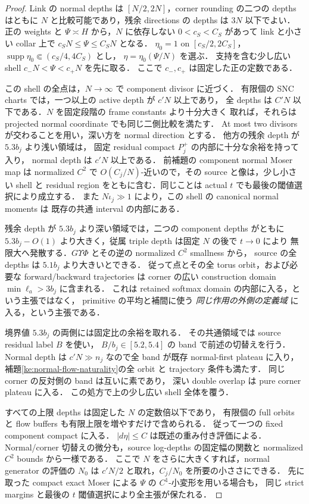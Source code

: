 \begin{proof}
Link の normal depths は $[N/2,2N]$，corner rounding の二つの depths はともに
$N$ と比較可能であり，残余 directions の depths は $3N$ 以下でよい．
正の weights と $\Psi\asymp H$ から，$N$ に依存しない $0<c_S<C_S$ があって
link と小さい collar 上で
$c_SN\le\Psi\le C_SN$ となる．
$\eta_0=1$ on $[c_S/2,2C_S]$，
$\operatorname{supp}\eta_0\Subset(c_S/4,4C_S)$ とし，
$\eta=\eta_0(\Psi/N)$ を選ぶ．
支持を含む少し広い shell $c_-N<\Psi<c_+N$ を先に取る．
ここで $c_-,c_+$ は固定した正の定数である．

この shell の全点は，$N\to\infty$ で component divisor に近づく．
有限個の SNC charts では，一つ以上の active depth が $c'N$ 以上であり，
全 depths は $C'N$ 以下である．$N$ を固定段階の frame constants より十分大きく
取れば，それらは projected normal coordinate でも同じ二側比較を満たす．
At most two divisors が交わることを用い，深い方を normal direction とする．
他方の残余 depth が $5.3b_j$ より浅い領域は，
固定 residual compact $P_j^+$ の内部に十分な余裕を持って入り，
normal depth は $c'N$ 以上である．
前補題の component normal Moser map は normalized $C^2$ で
$O(C_j/N)$-近いので，その source と像は，少し小さい shell と residual region
をともに含む．同じことは actual $t$ でも最後の閾値選択により成立する．
また $N\iota_j\gg1$ により，この shell の canonical normal moments は
既存の共通 interval の内部にある．

残余 depth が $5.3b_j$ より深い領域では，二つの component depths がともに
$5.3b_j-O(1)$ より大きく，従属 triple depth は固定 $N$ の後で $t\to0$ により
無限大へ発散する．$G\Upsilon\Phi$ とその逆の normalized $C^2$ smallness から，
source の全 depths は $5.1b_j$ より大きいとできる．
従って点とその全 torus orbit，および必要な forward/backward trajectories は
corner の広い construction domain $\min\ell_a>3b_j$ に含まれる．
これは retained softmax domain の内部に入る，という主張ではなく，
primitive の平均と補間に使う \emph{同じ作用の外側の定義域} に入る，という主張である．

境界値 $5.3b_j$ の両側には固定比の余裕を取れる．
その共通領域では source residual label $B$ を使い，
$B/b_j\in[5.2,5.4]$ の band で前述の切替えを行う．
Normal depth は $c'N\gg n_j$ なので全 band が既存 normal-first plateau に入り，
補題\ref{ke:normal-flow-naturality}の全 orbit と trajectory 条件も満たす．
同じ corner の反対側の band は互いに素であり，
深い double overlap は pure corner plateau に入る．
この処方で上の少し広い shell 全体を覆う．

すべての上限 depths は固定した $N$ の定数倍以下であり，
有限個の full orbits と flow buffers も有限上限を増やすだけで含められる．
従って一つの fixed component compact に入る．
$|d\eta|\le C$ は既述の重み付き評価による．
Normal/corner 切替えの微分も，source log-depths の固定幅の関数と
normalized $C^2$ bounds から一様である．
ここで $N$ をさらに大きくすれば，normal generator の評価の
$N_0$ は $c'N/2$ と取れ，$C_j/N_0$ を所要の小ささにできる．
先に取った compact exact Moser による $\Psi$ の $C^1$-小変形を用いる場合も，
同じ strict margins と最後の $t$ 閾値選択により全主張が保たれる．
\end{proof}

